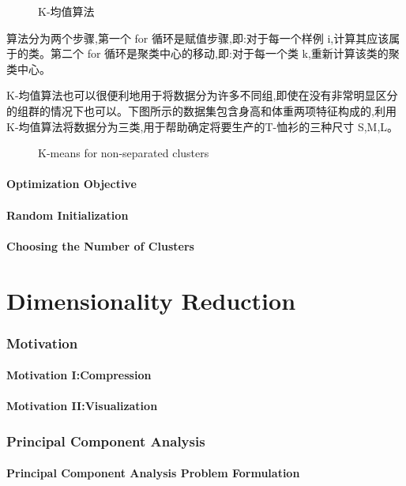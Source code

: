\documentclass{article}
\begin{document}
\begin{CJK}{UTF8}{gbsn}
\begin{figure}[H]
\label{fig:810}
\caption{K-均值算法}
\end{figure}
\subparagraph{}
算法分为两个步骤,第一个 for 循环是赋值步骤,即:对于每一个样例 i,计算其应该属于的类。第二个 for 循环是聚类中心的移动,即:对于每一个类 k,重新计算该类的聚类中心。
\subparagraph{}
K-均值算法也可以很便利地用于将数据分为许多不同组,即使在没有非常明显区分的组群的情况下也可以。下图所示的数据集包含身高和体重两项特征构成的,利用 K-均值算法将数据分为三类,用于帮助确定将要生产的T-恤衫的三种尺寸 S,M,L。
\begin{figure}[H]
\label{fig:812}
\caption{K-means for non-separated clusters}
\end{figure}
\begin{figure}[H]
\label{fig:811}
\end{figure}
\subsection{Optimization Objective}
\subsection{Random Initialization}
\subsection{Choosing the Number of Clusters}
\part{Dimensionality Reduction}
\section{Motivation}
\subsection{Motivation I:Compression}
\subsection{Motivation II:Visualization}
\section{Principal Component Analysis}
\subsection{Principal Component Analysis Problem Formulation}

\end{CJK}
\end{document}
